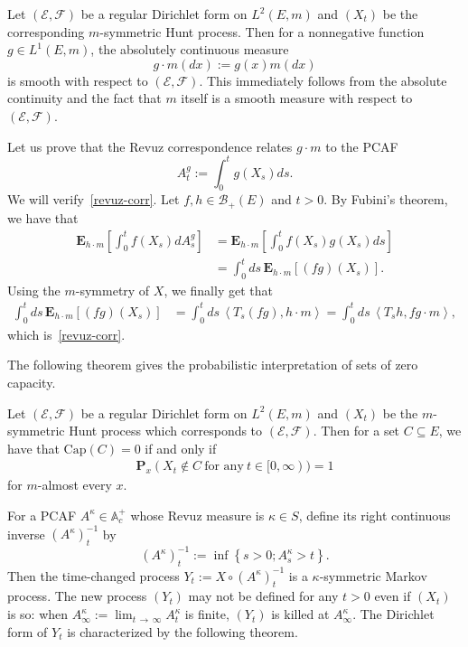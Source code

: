 \documentclass[AHL,Unicode,longabstracts,published]{cedram}
\newcommand{\ce}{\mathcal{E}}
\newcommand{\cf}{\mathcal{F}}
\newcommand{\cb}{\mathcal{B}}
\newcommand{\ba}{\mathbb{A}}
\newcommand{\bfE}{\mathbf{E}}
\newcommand{\bfP}{\mathbf{P}}
\newcommand{\Capp}{\mathrm{Cap}}
\begin{document}
\begin{exem}\label{abs-pcaf}
Let $(\ce,\cf)$ be a regular Dirichlet form on $L^2(E,m)$ and $(X_t)$ be the corresponding $m$-symmetric Hunt process. Then for a nonnegative function $g\in L^1(E,m)$, the absolutely continuous measure
\[
g\cdot m(dx):=g(x)m(dx)
\]
is smooth with respect to $(\ce,\cf)$. This immediately follows from the absolute continuity and the fact that $m$ itself is a smooth measure with respect to $(\ce,\cf)$.

Let us prove that the Revuz correspondence relates $g\cdot m$ to the PCAF
\[
A^g_t:=\int_0^t g(X_s)ds.
\]
We will verify~\eqref{revuz-corr}. Let $f,h\in\cb_+(E)$ and $t>0$. By Fubini's theorem, we have that
\begin{align*}
\bfE_{h\cdot m}\left[\int_0^{t}f(X_s)dA^g_s\right]&= \bfE_{h\cdot m} \left[\int_0^t f(X_s)g(X_s)ds\right]\\
&=\int_0^t ds\, \bfE_{h\cdot m}\left[(fg)(X_s)\right].
\end{align*}
Using the $m$-symmetry of $X$, we finally get that
\begin{align*}
\int_0^t ds\, \bfE_{h\cdot m}\left[(fg)(X_s)\right]&=\int_0^t ds\, \left\langle T_s(fg), h\cdot m\right\rangle =\int_0^t ds\, \left\langle T_sh, fg\cdot m\right\rangle,
\end{align*}
which is~\eqref{revuz-corr}.
\end{exem}

The following theorem gives the probabilistic interpretation of sets of zero capacity.

\begin{theo}
Let $(\ce,\cf)$ be a regular Dirichlet form on $L^2(E,m)$ and $(X_t)$ be the $m$-symmetric Hunt process which corresponds to $(\ce,\cf)$. Then for a set $C\subseteq E$, we have that $\Capp(C)=0$ if and only if
\begin{align*}
\bfP_x(X_t\notin C \ \text{for\ any}\ t\in[0,\infty))=1
\end{align*}
for $m$-almost every $x$.
\end{theo}

For a PCAF $A^{\kappa}\in\ba_c^+$ whose Revuz measure is $\kappa\in S$, define its right continuous inverse $(A^{\kappa})^{-1}_t$ by
\[
(A^{\kappa})^{-1}_t:=\inf\left\{s>0; A_s^{\kappa}>t\right\}.
\]
Then the time-changed process $Y_t:=X\circ (A^{\kappa})^{-1}_t$ is a $\kappa$-symmetric Markov process. The new process $(Y_t)$ may not be defined for any $t>0$ even if $(X_t)$ is so: when $A^{\kappa}_{\infty}:=\lim_{t\,\to\,\infty}A^{\kappa}_t$ is finite, $(Y_t)$ is killed at $A^{\kappa}_{\infty}$. The Dirichlet form of $Y_t$ is characterized by the following theorem.
\end{document}
